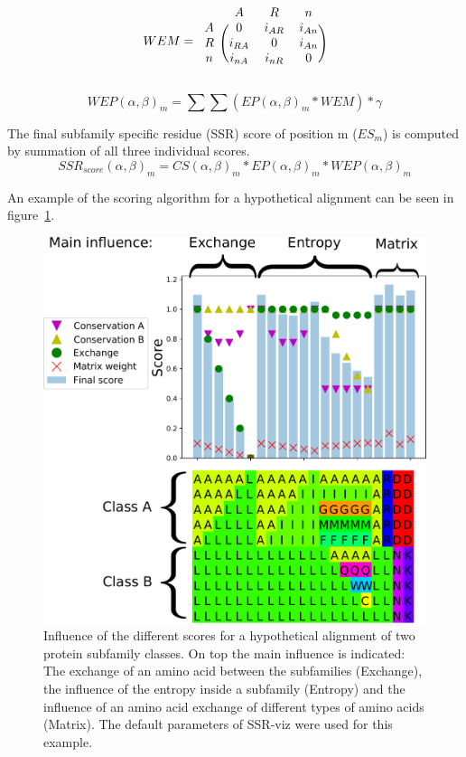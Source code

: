 \documentclass[a4paper,10pt]{article}
\begin{document}
\begin{equation}  \label{eq:we}
WEM =
\begin{blockarray}{cccc}
 & A & R  & n  \\
\begin{block}{c(ccc)}
  A & 0 & i_{AR}  & i_{An} \\
  R & i_{RA} & 0  &  i_{An} \\
  n & i_{nA} &  i_{nR}  & 0 \\
\end{block}
\end{blockarray}
\end{equation}

\begin{equation} \label{eq:wep}
WEP(\alpha,\beta)_m = \sum\sum (EP(\alpha,\beta)_m * WEM) * \gamma
\end{equation}

The final subfamily specific residue (SSR) score of position m ($ES_m$) is computed by 
summation of all three individual scores.
\begin{equation}
SSR_{score}(\alpha, \beta)_m = CS(\alpha, \beta)_m * EP(\alpha, \beta)_m * WEP(\alpha, \beta)_m 
\end{equation}

An example of the scoring algorithm for a hypothetical alignment can be seen in figure~\ref{fig:scoring_02bigger}.

\begin{figure}
  \includegraphics[width=\linewidth]{./figs/scoring_02bigger}
  \caption{Influence of the different scores for a hypothetical alignment of two protein subfamily classes. On top the main 
  influence is indicated: The exchange of an amino acid between the subfamilies (Exchange), the influence of
  the entropy inside a subfamily (Entropy) and the influence of an amino acid exchange of different 
  types of amino acids (Matrix). The default parameters of SSR-viz were used for this example.
  }
  \label{fig:scoring_02bigger}
\end{figure}
\end{document}
